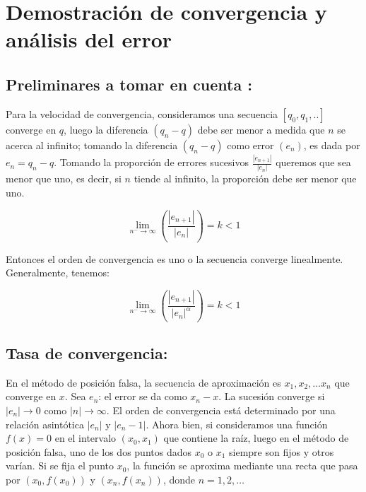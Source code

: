 \section{Demostración de convergencia y análisis del error}

\subsection{Preliminares a tomar en cuenta \cite{MR_PDF}:}

Para la velocidad de convergencia, consideramos una secuencia $ [q_0,q_1,..] $ converge en $ q $, luego la diferencia $ (q_n - q) $ debe ser menor a medida que $ n $ se acerca al infinito; tomando la diferencia $ (q_n - q) $ como error $ (e_n) $, es dada por $ e_n = q_n - q $.\newline\newline
Tomando la proporción de errores sucesivos $ \frac{|e_{n+1}|}{|e_n|} $ queremos que sea menor que uno, es decir, si $ n $ tiende al infinito, la proporción debe ser menor que uno.

\begin{displaymath}
    \lim_{n^{-} \to \infty} (\frac{|e_{n+1}|}{|e_n|}) = k < 1
\end{displaymath}
	
Entonces el orden de convergencia es uno o la secuencia converge linealmente.\newline
Generalmente, tenemos:

\begin{displaymath}
    \lim_{n^{-} \to \infty} (\frac{|e_{n+1}|}{|e_n|^\alpha}) = k < 1
\end{displaymath}

\subsection{Tasa de convergencia:}

En el método de posición falsa, la secuencia de aproximación es $ {x_1,x_2,\ldots x_n} $ que converge en $ x $. Sea $ e_n $: el error se da como $ x_n - x $. La sucesión converge si $ |e_n| \rightarrow 0 $ como $ |n| \rightarrow \infty $. El orden de convergencia está determinado por una relación asintótica $ |e_n| $ y $ |e_n - 1| $. Ahora bien, si consideramos una función $ f(x)=0 $ en el intervalo $ (x_0, x_1) $ que contiene la raíz, luego en el método de posición falsa, uno de los dos puntos dados $ x_0 $ o $ x_1 $ siempre son fijos y otros varían. Si se fija el punto $ x_0 $, la función se aproxima mediante una recta que pasa por $ (x_0, f(x_0)) $ y $ (x_n, f(x_n)) $, donde $ n=1,2,\ldots $

